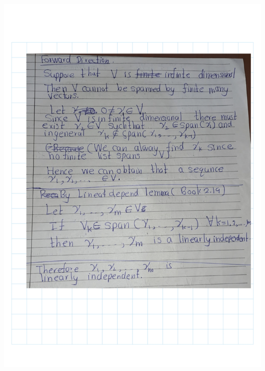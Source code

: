\documentclass[
]{book}
\theoremstyle{definition}
\theoremstyle{definition}
\theoremstyle{definition}
\theoremstyle{definition}
\theoremstyle{remark}
\begin{document}
\includegraphics{fig/Ex2A/Ex2A-22.png}
\end{document}
